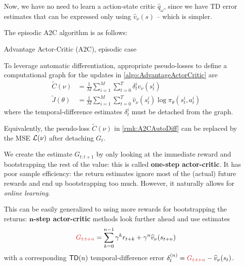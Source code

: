 \documentclass[../course-notes.tex]{subfiles}
\begin{document}
Now, we have no need to learn a action-state critic $\widehat{q}_\omega$, since we have TD error estimates that can be expressed only using $\widehat{v}_\nu(s)$ -- which is simpler.

The episodic A2C algorithm is as follows:

\begin{algorithm}[H]
	\caption{Advantage Actor-Critic (A2C), episodic case}\label{algo:AdvantageActorCritic}
\end{algorithm}


\begin{remark}\label{rmk:A2CAutoDiff}
	To leverage automatic differentiation, appropriate pseudo-losses to define a computational graph for the updates in \cref{algo:AdvantageActorCritic} are
	\begin{subequations}
	\begin{align}
	\tilde{C}(\nu) &= \frac{1}{M}\sum_{i=1}^M
	\sum_{t=0}^T\delta^i_t  \widehat{v}_\nu(s^i_t)  \\
	\tilde{J}(\theta) &=
	\frac{1}{M}\sum_{i=1}^M
	\sum_{t=0}^T \widehat{v}_\nu(s^i_t) \log\pi_\theta(s^i_t,a^i_t)
	\end{align}
	\end{subequations}
	where the temporal-difference estimates $\delta^i_t$ must be detached from the graph.

	Equivalently, the pseudo-loss $\tilde{C}(\nu)$ in \cref{rmk:A2CAutoDiff} can be replaced by the MSE $\mathcal{L}(\nu)$ after detaching $G_t$.
\end{remark}


We create the estimate $G_{t:t+1}$ by only looking at the immediate reward and bootstrapping the rest of the value: this is called \textbf{one-step actor-critic}. It has poor sample efficiency: the return estimates ignore most of the (actual) future rewards and end up bootstrapping too much. However, it naturally allows for \textit{online learning}.	

This can be easily generalized to using more rewards for bootstrapping the returns: \textbf{$\boldsymbol{n}$-step actor-critic} methods look further ahead and use estimates 
\[
	{\redfont G_{t:t+n}}
	= \sum_{k=0}^{n-1}\gamma^k r_{t+k} + \gamma^n \widehat{v}_\nu(s_{t+n})
\]
with a corresponding $\mathsf{TD}(n)$ temporal-difference error $\delta_t^{(n)} = {\redfont G_{t:t+n}} - \widehat{v}_\nu(s_{t})$.
\end{document}
